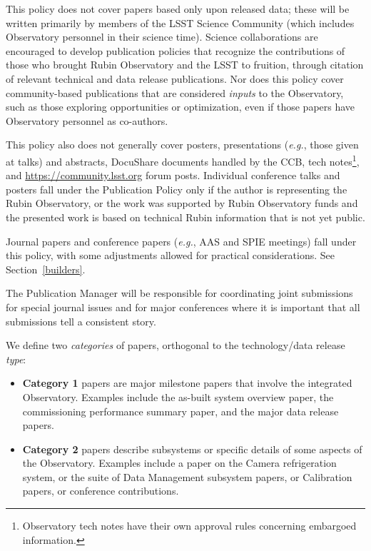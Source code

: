 This policy does not cover papers based only upon released data; these will be written primarily by members of the LSST Science Community (which includes Observatory personnel in their science time).
Science collaborations are encouraged to develop publication policies that recognize the contributions of those who brought Rubin Observatory and the LSST to fruition, through citation of relevant technical and data release
publications.
Nor does this policy cover community-based publications that are considered \emph{inputs} to the Observatory, such as those exploring opportunities or optimization, even if those papers have Observatory personnel as co-authors.

This policy also does not generally cover posters, presentations (\emph{e.g.}, those given at talks) and abstracts, DocuShare documents handled by the CCB, tech notes\footnote{
  Observatory tech notes have their own approval rules concerning embargoed information.
}, and \url{https://community.lsst.org} forum posts.
Individual conference talks and posters fall under the Publication Policy only if the author is representing the Rubin Observatory, or the work was supported by Rubin Observatory funds and the presented work is based on technical Rubin information that is not yet public.

Journal papers and conference papers (\emph{e.g.}, AAS and SPIE meetings) fall under this policy, with some adjustments allowed for practical considerations.
See Section~\ref{builders}.

The Publication Manager will be responsible for coordinating joint submissions for special journal issues and for major conferences where it is important that all submissions tell a consistent story.

We define two {\it categories} of papers, orthogonal to the technology/data release {\it type}:

\begin{itemize}
\item
  \textbf{Category 1} papers are major milestone papers that involve the integrated Observatory.
  Examples include the as-built system overview paper, the commissioning performance summary paper, and the major data release papers.
\item
  \textbf{Category 2} papers describe subsystems or specific details of some aspects of the Observatory.
  Examples include a paper on the Camera refrigeration system, or the suite of Data Management subsystem papers, or Calibration papers, or conference contributions.
\end{itemize}

